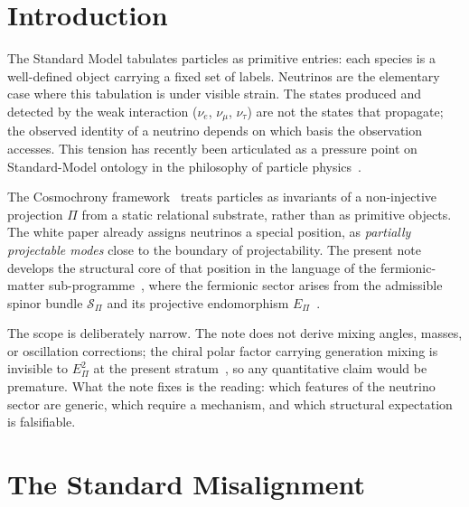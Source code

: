 \documentclass[11pt,a4paper]{article}
\theoremstyle{definition}
\newcommand{\Epi}{E_\Pi}
\newcommand{\Sbundle}{\mathcal{S}_\Pi}
\begin{document}
  \newpage
  \tableofcontents

  \newpage
  \section{Introduction}
    \label{sec:introduction}

    The Standard Model tabulates particles as primitive entries: each species is a well-defined object carrying a
    fixed set of labels.
    Neutrinos are the elementary case where this tabulation is under visible strain.
    The states produced and detected by the weak interaction ($\nu_e$, $\nu_\mu$, $\nu_\tau$) are not the states
    that propagate; the observed identity of a neutrino depends on which basis the observation accesses.
    This tension has recently been articulated as a pressure point on Standard-Model ontology in the philosophy
    of particle physics~\cite{Hobart2026OnticTypes}.

    The Cosmochrony framework~\cite{Cosmochrony} treats particles as invariants of a non-injective projection
    $\Pi$ from a static relational substrate, rather than as primitive objects.
    The white paper already assigns neutrinos a special position, as \emph{partially projectable modes} close to
    the boundary of projectability.
    The present note develops the structural core of that position in the language of the fermionic-matter
    sub-programme~\cite{Beau2026fmnote}, where the fermionic sector arises from the admissible spinor bundle
    $\Sbundle$ and its projective endomorphism $\Epi$~\cite{Beau2026q14}.

    The scope is deliberately narrow.
    The note does not derive mixing angles, masses, or oscillation corrections; the chiral polar factor carrying
    generation mixing is invisible to $\Epi^2$ at the present stratum~\cite{Beau2026pyo}, so any quantitative
    claim would be premature.
    What the note fixes is the reading: which features of the neutrino sector are generic, which require a
    mechanism, and which structural expectation is falsifiable.

  \section{The Standard Misalignment}
    \label{sec:standard-misalignment}
\end{document}
